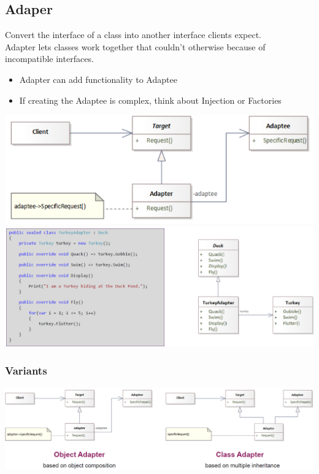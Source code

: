 \subsection{Adaper}
Convert the interface of a class into another interface clients expect.\\
Adapter lets classes work together that couldn't otherwise because of incompatible interfaces.\\
\begin{itemize}
    \item Adapter can add functionality to Adaptee
    \item If creating the Adaptee is complex, think about Injection or Factories
\end{itemize}
\includegraphics[width=0.7\linewidth]{../img/adapter_pattern.png}\\
\includegraphics[width=\linewidth]{../img/adapter_pattern_code.png}\\
\subsubsection{Variants}
\includegraphics[width=\linewidth]{../img/adapter_pattern_variants.png}

